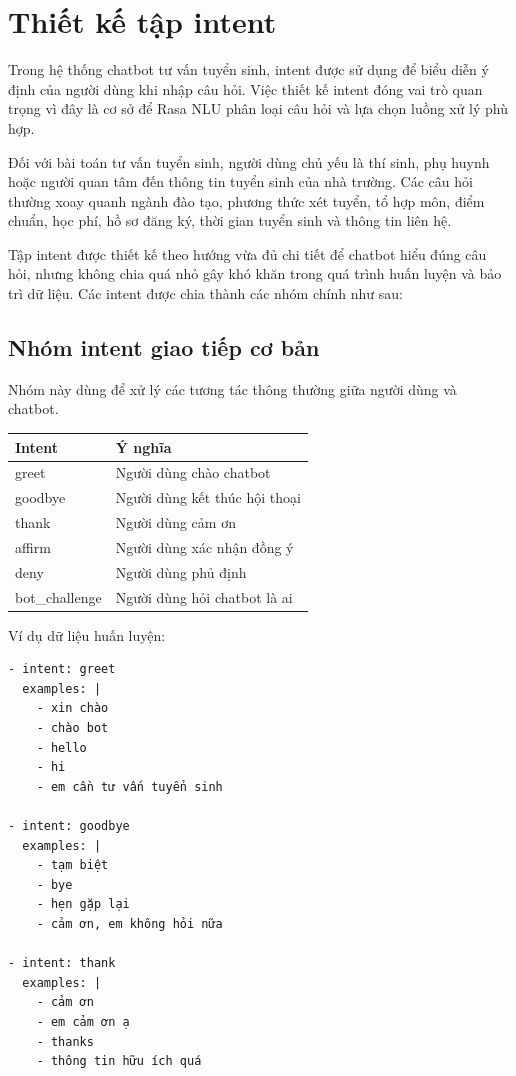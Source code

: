 ﻿\section{Thiết kế tập intent}

Trong hệ thống chatbot tư vấn tuyển sinh, intent được sử dụng để biểu diễn ý định của người dùng khi nhập câu hỏi. Việc thiết kế intent đóng vai trò quan trọng vì đây là cơ sở để Rasa NLU phân loại câu hỏi và lựa chọn luồng xử lý phù hợp.

Đối với bài toán tư vấn tuyển sinh, người dùng chủ yếu là thí sinh, phụ huynh hoặc người quan tâm đến thông tin tuyển sinh của nhà trường. Các câu hỏi thường xoay quanh ngành đào tạo, phương thức xét tuyển, tổ hợp môn, điểm chuẩn, học phí, hồ sơ đăng ký, thời gian tuyển sinh và thông tin liên hệ.

Tập intent được thiết kế theo hướng vừa đủ chi tiết để chatbot hiểu đúng câu hỏi, nhưng không chia quá nhỏ gây khó khăn trong quá trình huấn luyện và bảo trì dữ liệu. Các intent được chia thành các nhóm chính như sau:

\subsection*{Nhóm intent giao tiếp cơ bản}

Nhóm này dùng để xử lý các tương tác thông thường giữa người dùng và chatbot.

\begin{table}[H]
\centering
\begin{tabular}{|l|p{9cm}|}
\hline
\textbf{Intent} & \textbf{Ý nghĩa} \\
\hline
greet & Người dùng chào chatbot \\
\hline
goodbye & Người dùng kết thúc hội thoại \\
\hline
thank & Người dùng cảm ơn \\
\hline
affirm & Người dùng xác nhận đồng ý \\
\hline
deny & Người dùng phủ định \\
\hline
bot\_challenge & Người dùng hỏi chatbot là ai \\
\hline
\end{tabular}
\end{table}

Ví dụ dữ liệu huấn luyện:

\begin{verbatim}
- intent: greet
  examples: |
    - xin chào
    - chào bot
    - hello
    - hi
    - em cần tư vấn tuyển sinh

- intent: goodbye
  examples: |
    - tạm biệt
    - bye
    - hẹn gặp lại
    - cảm ơn, em không hỏi nữa

- intent: thank
  examples: |
    - cảm ơn
    - em cảm ơn ạ
    - thanks
    - thông tin hữu ích quá
\end{verbatim}

